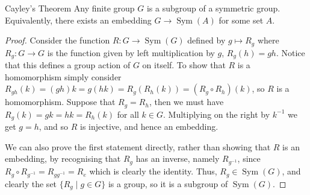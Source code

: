 \documentclass[fleqn]{NotesClass}
\DeclareMathOperator{\Sym}{Sym}
\begin{document}
    \begin{thm}{Cayley's Theorem}{}
        Any finite group \(G\) is a subgroup of a symmetric group.
        Equivalently, there exists an embedding \(G \to \Sym(A)\) for some set \(A\).
        \begin{proof}
            Consider the function \(R \colon G \to \Sym(G)\) defined by \(g \mapsto R_g\) where \(R_g \colon G \to G\) is the function given by left multiplication by \(g\), \(R_g(h) = gh\).
            Notice that this defines a group action of \(G\) on itself.
            To show that \(R\) is a homomorphism simply consider \(R_{gh}(k) = (gh)k = g(hk) = R_g(R_h(k)) = (R_g \circ R_h)(k)\), so \(R\) is a homomorphism.
            Suppose that \(R_g = R_h\), then we must have \(R_g(k) = gk = hk = R_h(k)\) for all \(k \in G\).
            Multiplying on the right by \(k^{-1}\) we get \(g = h\), and so \(R\) is injective, and hence an embedding.
            
            We can also prove the first statement directly, rather than showing that \(R\) is an embedding, by recognising that \(R_g\) has an inverse, namely \(R_{g^{-1}}\), since \(R_g \circ R_{g^{-1}} = R_{gg^{-1}} = R_e\) which is clearly the identity.
            Thus, \(R_g \in \Sym(G)\), and clearly the set \(\{R_g \mid g \in G\}\) is a group, so it is a subgroup of \(\Sym(G)\).
        \end{proof}
    \end{thm}
    
\end{document}
